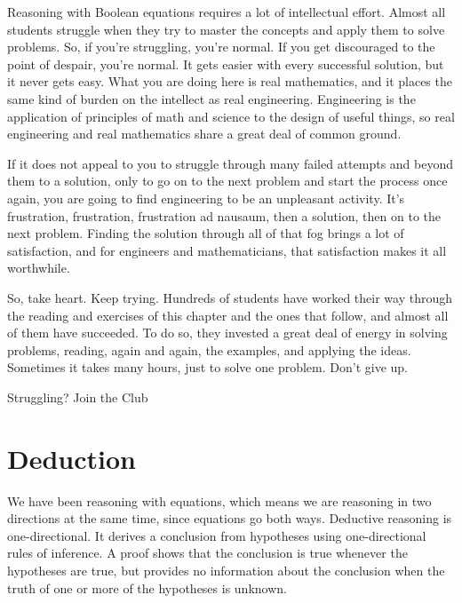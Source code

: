 \begin{aside}
Reasoning with Boolean equations requires a lot of intellectual effort.
Almost all students struggle when they try to master the concepts
and apply them to solve problems.
So, if you're struggling, you're normal.
If you get discouraged to the point of despair, you're normal.
It gets easier with every successful solution, but it never gets easy.
What you are doing here is real mathematics, and it places the same
kind of burden on the intellect as real engineering.
Engineering is the application of principles
of math and science to the design of useful things,
so real engineering and real mathematics share a great deal of common ground.

If it does not appeal to you to struggle through many
failed attempts and beyond them to a solution, only to
go on to the next problem and start the process once again,
you are going to find engineering to be an unpleasant activity.
It's frustration, frustration, frustration
ad nausaum, then a solution, then on to the next problem.
Finding the solution through all of that fog
brings a lot of satisfaction, and for engineers and mathematicians,
that satisfaction makes it all worthwhile.

So, take heart. Keep trying.
Hundreds of students have worked their way through the reading
and exercises of this chapter and the ones that follow,
and almost all of them have succeeded.
To do so, they invested a great deal of energy in solving problems,
reading, again and again, the examples, and applying the ideas.
Sometimes it takes many hours, just to solve one problem.
Don't give up.

\caption{Struggling? Join the Club}
\label{aside:struggling}
\end{aside}

\section{Deduction}
\label{sec:deduction}

We have been reasoning with equations, which means we are reasoning in two directions
at the same time, since equations go both ways. Deductive reasoning is one-directional.
It derives a conclusion from hypotheses using one-directional rules of inference.
A proof shows that the conclusion is true whenever the hypotheses are true, but provides
no information about the conclusion when the truth of one or more of the hypotheses is
unknown.

